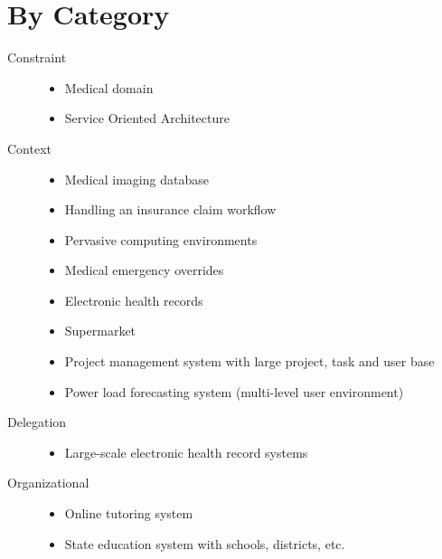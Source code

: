 \documentclass[letterpaper,10pt,english]{sphinxmanual}
\begin{document}
\section{By Category}
\label{research_questions/RQ_8:by-category}\begin{description}
\item[{Constraint}] \leavevmode\begin{itemize}
\item {} 
Medical domain

\item {} 
Service Oriented Architecture

\end{itemize}

\item[{Context}] \leavevmode\begin{itemize}
\item {} 
Medical imaging database

\item {} 
Handling an insurance claim workflow

\item {} 
Pervasive computing environments

\item {} 
Medical emergency overrides

\item {} 
Electronic health records

\item {} 
Supermarket

\item {} 
Project management system with large project, task and user base

\item {} 
Power load forecasting system (multi-level user environment)

\end{itemize}

\item[{Delegation}] \leavevmode\begin{itemize}
\item {} 
Large-scale electronic health record systems

\end{itemize}

\item[{Organizational}] \leavevmode\begin{itemize}
\item {} 
Online tutoring system

\item {} 
State education system with schools, districts, etc.


\end{itemize}
\end{description}
\end{document}
